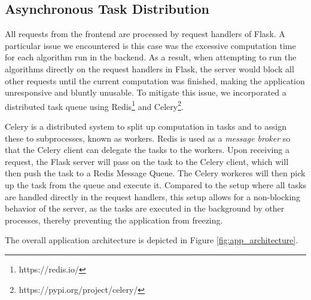 \subsection{Asynchronous Task Distribution}
All requests from the frontend are processed by request handlers of Flask. A particular issue we encountered is this case was the excessive computation time for each algorithm run in the backend. As a result, when attempting to run the algorithms directly on the request handlers in Flask, the server would block all other requests until the current computation was finished, making the application unresponsive and bluntly unusable. To mitigate this issue, we incorporated a distributed task queue using Redis\footnote{https://redis.io/} and Celery\footnote{https://pypi.org/project/celery/}.

Celery is a distributed system to split up computation in tasks and to assign these to subprocesses, known as workers. Redis is used as a \emph{message broker} so that the Celery client can delegate the tasks to the workers. Upon receiving a request, the Flask server will pass on the task to the Celery client, which will then push the task to a Redis Message Queue. The Celery workeres will then pick up the task from the queue and execute it. Compared to the setup where all tasks are handled directly in the request handlers, this setup allows for a non-blocking behavior of the server, as the tasks are executed in the background by other processes, thereby preventing the application from freezing.

The overall application architecture is depicted in Figure \ref{fig:app_architecture}.

